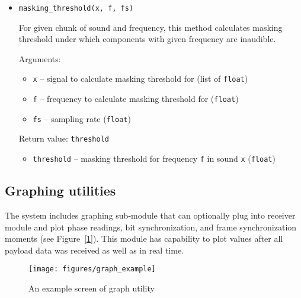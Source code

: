 \begin{itemize}
\item \verb|masking_threshold(x, f, fs)|

  For given chunk of sound and frequency, this method calculates masking threshold under which components with
  given frequency are inaudible.

  Arguments:
  \begin{itemize}
  \item \verb|x| -- signal to calculate masking threshold for (list of \verb|float|)
  \item \verb|f| -- frequency to calculate masking threshold for (\verb|float|)
  \item \verb|fs| -- sampling rate (\verb|float|)
  \end{itemize}

  Return value: \verb|threshold|
  \begin{itemize}
  \item \verb|threshold| -- masking threshold for frequency \verb|f| in sound \verb|x| (\verb|float|)
  \end{itemize}
\end{itemize}

\subsection{Graphing utilities}

The system includes graphing sub-module that can optionally plug into receiver module and plot phase readings, bit synchronization, and frame synchronization moments (see Figure~[\ref{fig:graph-utility}]).
This module has capability to plot values after all payload data was received as well as in real time.

\begin{figure}[p]
  \centering
  \texttt{[image: figures/graph\_example]}
  \caption{An example screen of graph utility}
  \label{fig:graph-utility}
\end{figure}
